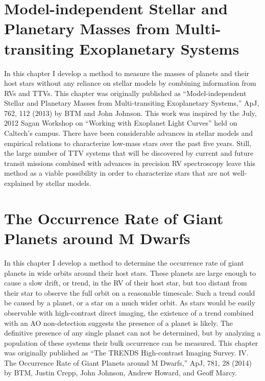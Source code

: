 \documentclass[12pt]{caltech_thesis}
\begin{document}
\chapter{Model-independent Stellar and Planetary Masses from Multi-transiting Exoplanetary Systems}
\label{chap:ttvs}

In this chapter I develop a method to measure the masses of planets and their host stars
without any reliance on stellar models by combining information from RVs and TTVs. 
This chapter was originally published as ``Model-independent Stellar and Planetary Masses from Multi-transiting Exoplanetary Systems,'' ApJ, 762, 112 (2013) by BTM and 
John Johnson. This work was inspired by the July, 2012 Sagan Workshop on ``Working with
Exoplanet Light Curves'' held on Caltech's campus.
There have been considerable advances in stellar models and
empirical relations to characterize low-mass stars over the past five years.
Still,
the large number of TTV systems that will be discovered by current and future transit
missions combined with advances in precision RV spectroscopy leave this method as a viable
possibility in order to characterize stars that are not well-explained by stellar models.






\chapter{The Occurrence Rate of Giant Planets around M Dwarfs}
\label{chap:trends}

In this chapter I develop a method to determine the occurrence
rate of giant planets in wide orbits around their host stars.
These planets are large enough to cause a slow drift, or trend, in 
the RV of their host star, but too distant from their star to
observe the full orbit on a reasonable timescale.
Such a trend could be caused by a planet, or a star on a much
wider orbit. As stars would be easily observable with high-contrast
direct imaging, the existence of a trend combined with an AO 
non-detection suggests the presence of a planet is likely.
The definitive presence of any single planet can not be 
determined, but by analyzing a population of these systems their
bulk occurrence can be measured.
This chapter was originally published as ``The TRENDS High-contrast Imaging Survey. IV. The Occurrence Rate of Giant Planets around M Dwarfs,'' ApJ, 781, 28 (2014) by BTM, Justin Crepp, John Johnson,
Andrew Howard, and Geoff Marcy. 
\end{document}
